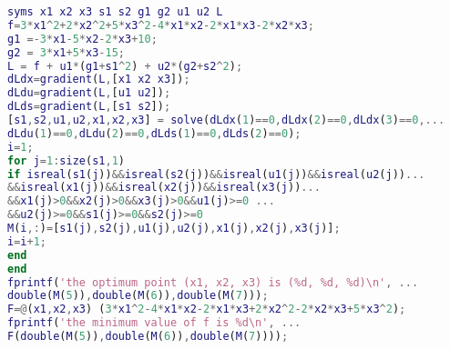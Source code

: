 \documentclass[12pt,a4paper]{report}
\begin{document}
\begin{CJK}{UTF8}{bsmi}
\begin{enumerate}
\newcommand{\noncopynumber}[1]{
	\BeginAccSupp{method=escape,ActualText={}}
	#1
	\EndAccSupp{}
}

\lstset{style=mystyle}

\begin{lstlisting}[language=matlab, caption=KKT method source code]
syms x1 x2 x3 s1 s2 g1 g2 u1 u2 L 
f=3*x1^2+2*x2^2+5*x3^2-4*x1*x2-2*x1*x3-2*x2*x3;
g1 =-3*x1-5*x2-2*x3+10;
g2 = 3*x1+5*x3-15;
L = f + u1*(g1+s1^2) + u2*(g2+s2^2);
dLdx=gradient(L,[x1 x2 x3]);
dLdu=gradient(L,[u1 u2]);
dLds=gradient(L,[s1 s2]);
[s1,s2,u1,u2,x1,x2,x3] = solve(dLdx(1)==0,dLdx(2)==0,dLdx(3)==0,...
dLdu(1)==0,dLdu(2)==0,dLds(1)==0,dLds(2)==0);
i=1;
for j=1:size(s1,1)
if isreal(s1(j))&&isreal(s2(j))&&isreal(u1(j))&&isreal(u2(j))...
&&isreal(x1(j))&&isreal(x2(j))&&isreal(x3(j))...
&&x1(j)>0&&x2(j)>0&&x3(j)>0&&u1(j)>=0 ...
&&u2(j)>=0&&s1(j)>=0&&s2(j)>=0
M(i,:)=[s1(j),s2(j),u1(j),u2(j),x1(j),x2(j),x3(j)];
i=i+1;
end
end
fprintf('the optimum point (x1, x2, x3) is (%d, %d, %d)\n', ...
double(M(5)),double(M(6)),double(M(7)));
F=@(x1,x2,x3) (3*x1^2-4*x1*x2-2*x1*x3+2*x2^2-2*x2*x3+5*x3^2);
fprintf('the minimum value of f is %d\n', ...
F(double(M(5)),double(M(6)),double(M(7))));
\end{lstlisting}
\end{enumerate}
\end{CJK}
\end{document}
